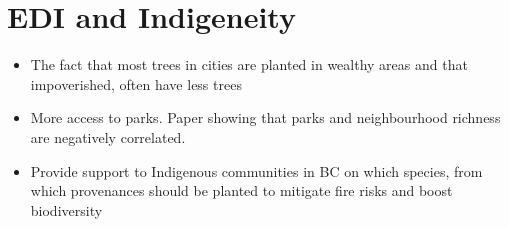 \documentclass[11pt,letter]{article}
\begin{document}
\section *{EDI and Indigeneity}
\begin{itemize}
	\item The fact that most trees in cities are planted in wealthy areas and that impoverished, often have less trees
	\item More access to parks. Paper showing that parks and neighbourhood richness are negatively correlated.
	\item Provide support to Indigenous communities in BC on which species, from which provenances should be planted to mitigate fire risks and boost biodiversity
\end{itemize}
\end{document}
